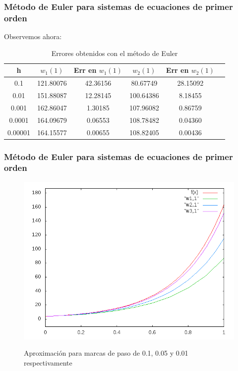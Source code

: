 \documentclass{beamer}
\begin{document}
\begin{frame}
	\frametitle{Método de Euler para sistemas de ecuaciones de primer orden}
	
	Observemos ahora:
	
	\begin{table}[H]
		\centering
		\setlength\extrarowheight{2.5pt}
		
		\begin{tabular}{|c|c|c|c|c|c}
			\hline
			\textbf{h} & {\textbf{$w_1(1)$}} & \textbf{Err en $w_1(1)$} & {\textbf{$w_2(1)$}} & \textbf{Err en $w_2(1)$} \\ 
			\hline
			0.1 & 121.80076 & 42.36156 & 80.67749 & 28.15092\\
			\hline
			0.01 & 151.88087 & 12.28145 & 100.64386 & 8.18455\\
			\hline
			0.001 & 162.86047 & 1.30185 & 107.96082 & 0.86759\\
			\hline
			0.0001 & 164.09679 & 0.06553 & 108.78482 & 0.04360\\
			\hline
			0.00001 & 164.15577 & 0.00655 & 108.82405 & 0.00436\\
			\hline   
		\end{tabular}
		
		\caption{Errores obtenidos con el método de Euler}           
	\end{table}
	
\end{frame}

\begin{frame}
	\frametitle{Método de Euler para sistemas de ecuaciones de primer orden}
	
	\begin{figure}[H]
		\centering
		\includegraphics[scale=0.4]{img/grafica2.png}
		\label{figura1}
		\caption{Aproximación para marcas de paso de 0.1, 0.05 y 0.01 respectivamente} 
	\end{figure}
	
\end{frame}
\end{document}
